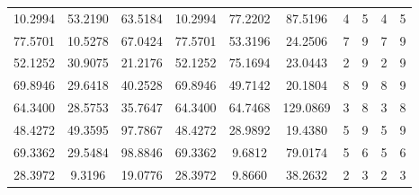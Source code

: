 \documentclass[withoutpreface,bwprint]{cumcmthesis} %
\begin{document}
\begin{appendices}
\begin{table}[htbp!]
\begin{tabular}{@{}cccccccccc@{}}
							10.2994                          & 53.2190                          & 63.5184                          & 10.2994                          & 77.2202                          & 87.5196                          & 4                    & 5                    & 4                      & 5                      \\
							77.5701                          & 10.5278                          & 67.0424                          & 77.5701                          & 53.3196                          & 24.2506                          & 7                    & 9                    & 7                      & 9                      \\
							52.1252                          & 30.9075                          & 21.2176                          & 52.1252                          & 75.1694                          & 23.0443                          & 2                    & 9                    & 2                      & 9                      \\
							69.8946                          & 29.6418                          & 40.2528                          & 69.8946                          & 49.7142                          & 20.1804                          & 8                    & 9                    & 8                      & 9                      \\
							64.3400                          & 28.5753                          & 35.7647                          & 64.3400                          & 64.7468                          & 129.0869                         & 3                    & 8                    & 3                      & 8                      \\
							48.4272                          & 49.3595                          & 97.7867                          & 48.4272                          & 28.9892                          & 19.4380                          & 5                    & 9                    & 5                      & 9                      \\
							69.3362                          & 29.5484                          & 98.8846                          & 69.3362                          & 9.6812                           & 79.0174                          & 5                    & 6                    & 5                      & 6                      \\
							28.3972                          & 9.3196                           & 19.0776                          & 28.3972                          & 9.8660                           & 38.2632                          & 2                    & 3                    & 2                      & 3                      \\

\end{tabular}
\end{table}
\end{appendices}
\end{document}
